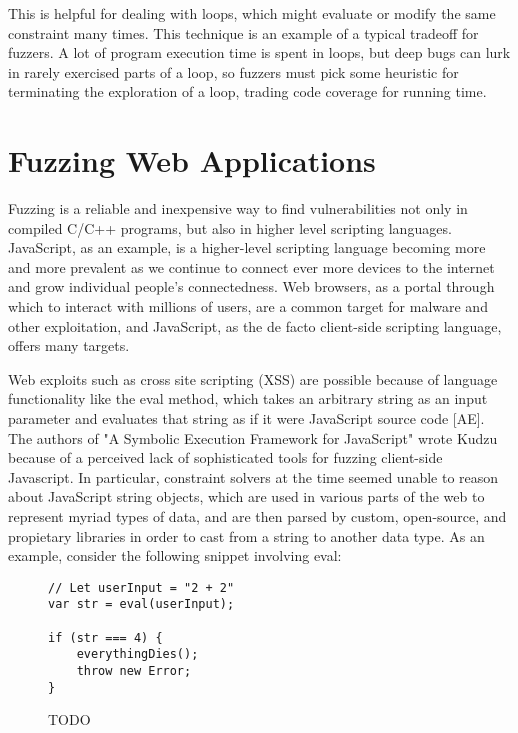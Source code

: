 \documentclass[11pt,expanded,copyright]{fsuthesis}
\begin{document}
This is helpful for dealing with loops, which might evaluate or modify the same constraint many times. This technique is an example of a typical tradeoff for fuzzers. A lot of program execution time is spent in loops, but deep bugs can lurk in rarely exercised parts of a loop, so fuzzers must pick some heuristic for terminating the exploration of a loop, trading code coverage for running time.


\section{Fuzzing Web Applications}

Fuzzing is a reliable and inexpensive way to find vulnerabilities not only in compiled C/C++ programs, but also in higher level scripting languages. JavaScript, as an example, is a higher-level scripting language becoming more and more prevalent as we continue to connect ever more devices to the internet and grow individual people's connectedness. Web browsers, as a portal through which to interact with millions of users, are a common target for malware and other exploitation, and JavaScript, as the de facto client-side scripting language, offers many targets. 

Web exploits such as cross site scripting (XSS) are possible because of language functionality like the eval method, which takes an arbitrary string as an input parameter and evaluates that string as if it were JavaScript source code [AE]. The authors of "A Symbolic Execution Framework for JavaScript" wrote Kudzu because of a perceived lack of sophisticated tools for fuzzing client-side Javascript. In particular, constraint solvers at the time seemed unable to reason about JavaScript string objects, which are used in various parts of the web to represent myriad types of data, and are then parsed by custom, open-source, and propietary libraries in order to cast from a string to another data type. As an example, consider the following snippet involving eval:

\begin{figure}
\begin{lstlisting}[style=jsstyle]
// Let userInput = "2 + 2"
var str = eval(userInput); 

if (str === 4) {
	everythingDies();
	throw new Error;
}
\end{lstlisting}
\caption{TODO}
\end{figure}
\end{document}

